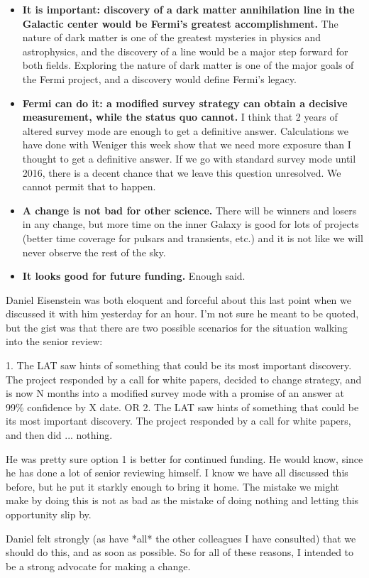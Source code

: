 \documentclass[aps,prd,superscriptaddress,showpacs,nofootinbib,fixlfloat, 12pt]{revtex4-1}
\begin{document}
\begin{itemize}

\item{\bf It is important: discovery of a dark matter annihilation line in the
    Galactic center would be Fermi's greatest accomplishment.}  The nature of
  dark matter is one of the greatest mysteries in physics and astrophysics,
  and the discovery of a line would be a major step forward for both fields.
  Exploring the nature of dark matter is one of the major goals of the Fermi
  project, and a discovery would define Fermi's legacy.

\item{\bf Fermi can do it: a modified survey strategy can obtain a decisive
    measurement, while the status quo cannot.}  I think that 2 years of
  altered survey mode are enough to get a definitive answer.  Calculations we
  have done with Weniger this week show that we need more exposure than I
  thought to get a definitive answer.  If we go with standard survey mode
  until 2016, there is a decent chance that we leave this question unresolved.
  We cannot permit that to happen.

\item{\bf A change is not bad for other science.}  There will be winners and
  losers in any change, but more time on the inner Galaxy is good for lots of
  projects (better time coverage for pulsars and transients, etc.) and it is
  not like we will never observe the rest of the sky.

\item{\bf It looks good for future funding.}  Enough said. 

\end{itemize}

Daniel Eisenstein was both eloquent and forceful about this last point
when we discussed it with him yesterday for an hour.  I'm not sure he
meant to be quoted, but the gist was that there are two possible
scenarios for the situation walking into the senior review:

1.  The LAT saw hints of something that could be its most important
discovery.  The project responded by a call for white papers, decided
to change strategy, and is now N months into a modified survey mode
with a promise of an answer at 99\% confidence by X date.
OR
2.  The LAT saw hints of something that could be its most important
discovery.  The project responded by a call for white papers, and then
did ... nothing.

He was pretty sure option 1 is better for continued funding.  He would
know, since he has done a lot of senior reviewing himself.  I know we
have all discussed this before, but he put it starkly enough to bring
it home.  The mistake we might make by doing this is not as bad as the
mistake of doing nothing and letting this opportunity slip by.

Daniel felt strongly (as have *all* the other colleagues I have
consulted) that we should do this, and as soon as possible.  So for
all of these reasons, I intended to be a strong advocate for making a
change.



\clearpage

\end{document}
